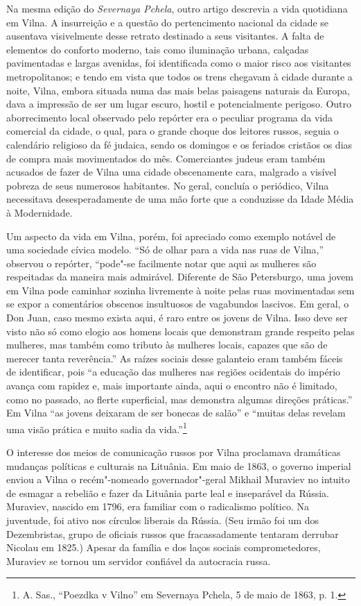 Na mesma edição do \emph{Severnaya Pchela}, outro artigo descrevia a
vida quotidiana em Vilna. A insurreição e a questão do pertencimento
nacional da cidade se ausentava visivelmente desse retrato destinado a
seus visitantes. A falta de elementos do conforto moderno, tais como
iluminação urbana, calçadas pavimentadas e largas avenidas, foi
identificada como o maior risco aos visitantes metropolitanos; e tendo
em vista que todos os trens chegavam à cidade durante a noite, Vilna,
embora situada numa das mais belas paisagens naturais da Europa, dava a
impressão de ser um lugar escuro, hostil e potencialmente perigoso.
Outro aborrecimento local observado pelo repórter era o peculiar
programa da vida comercial da cidade, o qual, para o grande choque dos
leitores russos, seguia o calendário religioso da fé judaica, sendo os
domingos e os feriados cristãos os dias de compra mais movimentados do
mês. Comerciantes judeus eram também acusados de fazer de Vilna uma
cidade obscenamente cara, malgrado a visível pobreza de seus numerosos
habitantes. No geral, concluía o periódico, Vilna necessitava
desesperadamente de uma mão forte que a conduzisse da Idade Média à
Modernidade.

Um aspecto da vida em Vilna, porém, foi apreciado como exemplo notável
de uma sociedade cívica modelo. ``Só de olhar para a vida nas ruas de
Vilna,'' observou o repórter, ``pode"-se facilmente notar que aqui as
mulheres são respeitadas da maneira mais admirável. Diferente de São
Petersburgo, uma jovem em Vilna pode caminhar sozinha livremente à noite
pelas ruas movimentadas sem se expor a comentários obscenos insultuosos
de vagabundos lascivos. Em geral, o Don Juan, caso mesmo exista aqui, é
raro entre os jovens de Vilna. Isso deve ser visto não só como elogio
aos homens locais que demonstram grande respeito pelas mulheres, mas
também como tributo às mulheres locais, capazes que são de merecer tanta
reverência.'' As raízes sociais desse galanteio eram também fáceis de
identificar, pois ``a educação das mulheres nas regiões ocidentais do
império avança com rapidez e, mais importante ainda, aqui o encontro não
é limitado, como no passado, ao flerte superficial, mas demonstra
algumas direções práticas.'' Em Vilna ``as jovens deixaram de ser
bonecas de salão'' e ``muitas delas revelam uma visão prática e muito
sadia da vida.''\footnote{A. Sas., ``Poezdka v Vilno'' em Severnaya
  Pchela, 5 de maio de 1863, p. 1.}

O interesse dos meios de comunicação russos por Vilna proclamava
dramáticas mudanças políticas e culturais na Lituânia. Em maio de 1863,
o governo imperial enviou a Vilna o recém"-nomeado governador"-geral
Mikhail Muraviev no intuito de esmagar a rebelião e fazer da Lituânia
parte leal e inseparável da Rússia. Muraviev, nascido em 1796, era
familiar com o radicalismo político. Na juventude, foi ativo nos
círculos liberais da Rússia. (Seu irmão foi um dos Dezembristas, grupo
de oficiais russos que fracassadamente tentaram derrubar Nicolau  em
1825.) Apesar da família e dos laços sociais comprometedores, Muraviev
se tornou um servidor confiável da autocracia russa.

